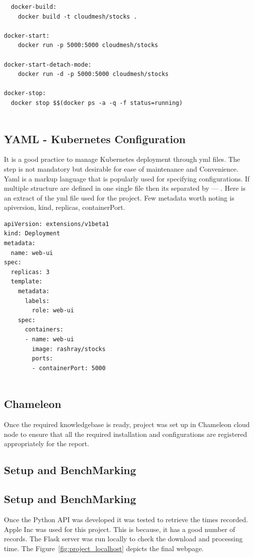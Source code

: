 \begin{verbatim}
  docker-build:
	docker build -t cloudmesh/stocks .
	
docker-start:
	docker run -p 5000:5000 cloudmesh/stocks
	
docker-start-detach-mode:
	docker run -d -p 5000:5000 cloudmesh/stocks

docker-stop:
  docker stop $$(docker ps -a -q -f status=running)
  
\end{verbatim}
\subsection{YAML - Kubernetes Configuration}
It is a good practice to manage Kubernetes deployment through yml files. The
step is not mandatory but desirable for ease of maintenance and Convenience.
Yaml is a markup language that is popularly used for specifying
configurations. If multiple structure are defined in one single file then its
separated by --- . Here is an extract of the yml file used for the project.
Few metadata worth noting is apiversion, kind, replicas, containerPort.

\begin{verbatim}
apiVersion: extensions/v1beta1
kind: Deployment
metadata:
  name: web-ui
spec:
  replicas: 3
  template:
    metadata:
      labels:
        role: web-ui
    spec:
      containers:
      - name: web-ui
        image: rashray/stocks
        ports:
        - containerPort: 5000
  
\end{verbatim}
\subsection{Chameleon}
Once the required knowledgebase is ready, project was set up in Chameleon
cloud node to ensure that all the required installation and configurations are
registered appropriately for the report.
\subsection{Setup and BenchMarking}

\subsection{Setup and BenchMarking}

Once the Python API was developed it was tested to retrieve the times
recorded. Apple Inc was used for this project. This is because, it has a good
number of records. The Flask server was run locally to check the download and
processing time. The Figure~\ref{fig:project_localhost} depicts the final
webpage.

